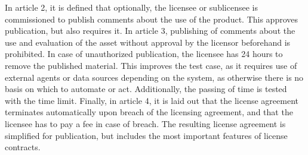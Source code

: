 \documentclass[conference]{IEEEtran}
\begin{document}
In article 2, it is defined that optionally, the licensee or sublicensee is commissioned to publish comments about the use of the product. This %
approves publication, but also requires it. %
In article 3, publishing of comments about the use and evaluation of the asset without approval by the licensor beforehand is prohibited.
In case of unauthorized publication, %
the licensee has 24 hours to remove the published material. This improves %
the test case, as it %
requires use of external agents or data sources depending on the system, as otherwise there is no basis on which to automate or act. Additionally, the passing of time is tested with the time limit.
Finally, in article 4, it is laid out that the license agreement terminates automatically upon breach of the licensing agreement, and that the licensee has to pay a fee in case of breach.
The resulting license agreement is simplified for publication, but includes the most important features of license contracts.
\end{document}
